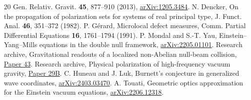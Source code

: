 \documentclass[11pt]{article}
\begin{document}
\begin{thebibliography}{20}
Gen. Relativ. Gravit. \textbf{45}, 877--910 (2013),
\href{https://arxiv.org/abs/1205.3484}{arXiv:1205.3484}.
 N. Dencker,
On the propagation of polarization sets for systems of real principal type,
J. Funct. Anal. \textbf{46}, 351--372 (1982).
 P. G\'erard, Microlocal defect measures,
Comm. Partial Differential Equations \textbf{16}, 1761--1794 (1991).
 P. Mondal and S.-T. Yau,
Einstein--Yang--Mills equations in the double null framework,
\href{https://arxiv.org/abs/2205.01101}{arXiv:2205.01101}.
 Research archive, Gravitational readouts of a localized non-Abelian null-beam collision,
\href{https://github.com/g3173028019-beep/ai-automated-quantum-gravity-research/tree/main/papers/43-localized-nonabelian-null-collision}{Paper 43}.
 Research archive, Physical polarization of high-frequency vacuum gravity,
\href{https://github.com/g3173028019-beep/ai-automated-quantum-gravity-research/tree/main/papers/29b-high-frequency-graviton-polarization}{Paper 29B}.
 C. Huneau and J. Luk, Burnett's conjecture in generalized wave coordinates,
\href{https://arxiv.org/abs/2403.03470}{arXiv:2403.03470}.
 A. Touati, Geometric optics approximation for the Einstein vacuum equations,
\href{https://arxiv.org/abs/2206.12318}{arXiv:2206.12318}.
\end{thebibliography}
\end{document}
